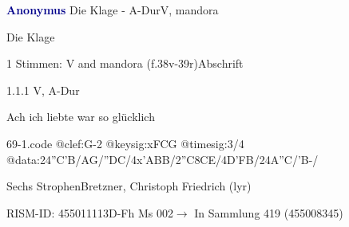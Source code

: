 \documentclass[twocolumn, 12pt]{book}
\begin{document}
\par \vspace{16pt} \textcolor{darkblue}{\textbf{Anonymus  }}\hfillplus{\textbf{[69]}}\newline Die Klage - A-Dur\newline V, mandora
\par \begin{itshape}[heading, f.38v:] Die Klage\end{itshape} 
\par \textcolor{darkblue}{}  1 Stimmen: V and mandora  (f.38v-39r)\newline Abschrift
\par 1.1.1  V, A-Dur\newline \begin{footnotesize} Ach ich liebte war so glücklich \end{footnotesize}  
\begin{filecontents*}{69-1.code}
@clef:G-2
@keysig:xFCG
@timesig:3/4
@data:24''C'B/AG/''DC/4x'ABB/2''C{8CE}/4D'FB/24A''C/'B-/
\end{filecontents*}
\newline %
\par Sechs Strophen\newline Bretzner, Christoph Friedrich  (lyr)
\par RISM-ID: 455011113\newline D-Fh  Ms 002\newline $\rightarrow$ In Sammlung 419 (455008345)
      
\end{document}
